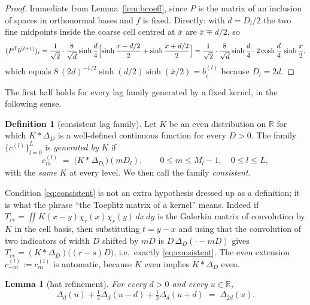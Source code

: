 \documentclass[11pt,a4paper]{article}
\theoremstyle{plain}
\newtheorem{lemma}[theorem]{Lemma}
\theoremstyle{definition}
\newtheorem{definition}[theorem]{Definition}
\newcommand{\R}{\mathbb{R}}
\newcommand{\T}{\mathsf{T}}
\begin{document}
\begin{proof}
Immediate from Lemma~\ref{lem:bcoeff}, since $P$ is the matrix of an inclusion of
spaces in orthonormal bases and $f$ is fixed. Directly: with $d=D_{l}/2$ the two fine
midpoints inside the coarse cell centred at $\bar x$ are $\bar x\mp d/2$, so
\[
  (P^{\T}b^{(l+1)})_{i}
  =\frac{1}{\sqrt2}\cdot\frac{8}{\sqrt d}\sinh\frac d4
   \Bigl[\sinh\frac{\bar x-d/2}{2}+\sinh\frac{\bar x+d/2}{2}\Bigr]
  =\frac{1}{\sqrt2}\cdot\frac{8}{\sqrt d}\sinh\frac d4\cdot
   2\cosh\frac d4\,\sinh\frac{\bar x}{2},
\]
which equals $8\,(2d)^{-1/2}\sinh(d/2)\sinh(\bar x/2)=b^{(l)}_{i}$ because
$D_{l}=2d$.
\end{proof}

The first half holds for every lag family generated by a fixed kernel, in the
following sense.

\begin{definition}[consistent lag family]
\label{def:consistent}
Let $K$ be an even distribution on $\R$ for which $K*\Delta_{D}$ is a well-defined
continuous function for every $D>0$. The family $\{c^{(l)}\}_{l=0}^{L}$ is
\emph{generated by} $K$ if
\begin{equation}
\label{eq:consistent}
  c^{(l)}_{m}\;=\;\bigl(K*\Delta_{D_{l}}\bigr)(mD_{l}),
  \qquad 0\le m\le M_{l}-1,\quad 0\le l\le L,
\end{equation}
with the \emph{same} $K$ at every level. We then call the family \emph{consistent}.
\end{definition}

Condition \eqref{eq:consistent} is not an extra hypothesis dressed up as a
definition; it is what the phrase ``the Toeplitz matrix of a kernel'' means. Indeed if
$T_{rs}=\iint K(x-y)\chi_{r}(x)\chi_{s}(y)\,dx\,dy$ is the Galerkin matrix of
convolution by $K$ in the cell basis, then substituting $t=y-x$ and using that the
convolution of two indicators of width $D$ shifted by $mD$ is $D\,\Delta_{D}(\cdot-mD)$
gives $T_{rs}=(K*\Delta_{D})\bigl((r-s)D\bigr)$, i.e.\ exactly \eqref{eq:consistent}.
The even extension $c^{(l)}_{-m}:=c^{(l)}_{m}$ is automatic, because $K$ even implies
$K*\Delta_{D}$ even.

\begin{lemma}[hat refinement]
\label{lem:hat}
For every $d>0$ and every $u\in\R$,
\begin{equation}
\label{eq:hatref}
  \Delta_{d}(u)+\tfrac12\Delta_{d}(u-d)+\tfrac12\Delta_{d}(u+d)
  \;=\;\Delta_{2d}(u).
\end{equation}
\end{lemma}
\end{document}
